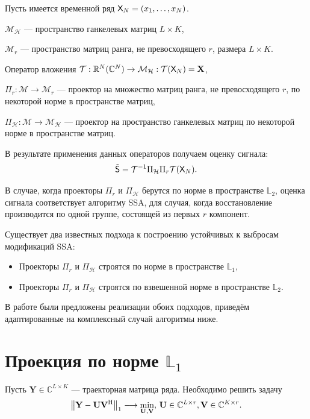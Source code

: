 \documentclass[specialist,
               substylefile = spbu.rtx,
               subf,href,colorlinks=true, 12pt]{disser}
\begin{document}
Пусть имеется временной ряд $\textsf{X}_N=(x_1, \ldots, x_{N})$.

$\mathcal{M}_{\mathcal{H}}$ --- пространство ганкелевых матриц $L\times K$,

$\mathcal{M}_{r}$ --- пространство матриц ранга, не превосходящего $r$, размера $L \times K$.

Оператор вложения $\mathcal{T}:\mathbb{R}^N(\mathbb{C}^N) \rightarrow \mathcal{M}_{\mathcal{H}}: \mathcal{T} (\textsf{X}_N) = \mathbf{X} $,

$\Pi_{r}:\mathcal{M}\rightarrow \mathcal{M}_r$ --- проектор на множество матриц ранга, не превосходящего $r$, по некоторой норме в пространстве матриц,

$\Pi_{\mathcal{H}}:\mathcal{M} \rightarrow \mathcal{M}_{\mathcal{H}}$ --- проектор на пространство ганкелевых матриц по некоторой норме в пространстве матриц.

В результате применения данных операторов получаем оценку сигнала:
\begin{equation*}
	\tilde{\textsf{S}} = \mathcal{T}^{-1} \Pi_{\mathcal{H}} \Pi_{r} \mathcal{T} (\textsf{X}_N).
\end{equation*}

В случае, когда проекторы $\Pi_r$ и $\Pi_{\mathcal{H}}$ берутся по норме в пространстве $\mathbb{L}_2$, оценка сигнала соответствует алгоритму SSA, для случая, когда восстановление производится по одной группе, состоящей из первых $r$ компонент.

Существует два известных подхода к построению устойчивых к выбросам модификаций SSA:

\begin{itemize}
	\item Проекторы $ \Pi_{r}$ и $\Pi_{\mathcal{H}} $ строятся по норме в пространстве $\mathbb{L}_1$,
	\item Проекторы $ \Pi_{r}$ и $\Pi_{\mathcal{H}} $ строятся по взвешенной норме в пространстве $\mathbb{L}_2$.
\end{itemize}

В работе \cite{Tretyakova20} были предложены реализации обоих подходов, приведём адаптированные на комплексный случай алгоритмы ниже. 


\section{Проекция по норме $\mathbb{L}_1$}

Пусть $\mathbf{Y} \in \mathbb{C}^{L\times K}$ --- траекторная матрица ряда.
Необходимо решить задачу
\begin{equation*}
	\norm{\mathbf{Y}-\mathbf{U}\mathbf{V}^{\mathrm{H}}}_1 \longrightarrow \min_{\mathbf{U},\mathbf{V}}, \, \mathbf{U} \in \mathbb{C}^{L\times r}, \mathbf{V} \in \mathbb{C}^{K\times r}.
\end{equation*}
\end{document}
